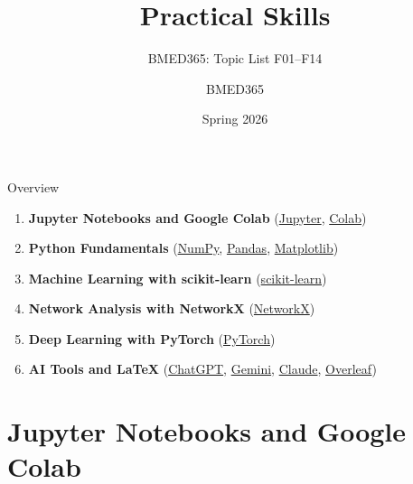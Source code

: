 \documentclass[aspectratio=169, 10pt]{beamer}
\title{Practical Skills}
\subtitle{BMED365: Topic List F01--F14}
\author{BMED365}
\date{Spring 2026}
\begin{document}
\begin{frame}
    \titlepage
\end{frame}

\begin{frame}{Overview}
    \begin{enumerate}
        \item \textbf{Jupyter Notebooks and Google Colab}
        (\href{https://jupyter.org/}{Jupyter}, \href{https://colab.research.google.com/}{Colab})
        \item \textbf{Python Fundamentals}
        (\href{https://numpy.org/}{NumPy}, \href{https://pandas.pydata.org/}{Pandas}, \href{https://matplotlib.org/}{Matplotlib})
        \item \textbf{Machine Learning with scikit-learn}
        (\href{https://scikit-learn.org/}{scikit-learn})
        \item \textbf{Network Analysis with NetworkX}
        (\href{https://networkx.org/}{NetworkX})
        \item \textbf{Deep Learning with PyTorch}
        (\href{https://pytorch.org/}{PyTorch})
        \item \textbf{AI Tools and LaTeX}
        (\href{https://chat.openai.com/}{ChatGPT}, \href{https://gemini.google.com/}{Gemini}, \href{https://claude.ai/}{Claude}, \href{https://www.overleaf.com/}{Overleaf})
    \end{enumerate}
\end{frame}

\section{Jupyter Notebooks and Google Colab}
\end{document}
